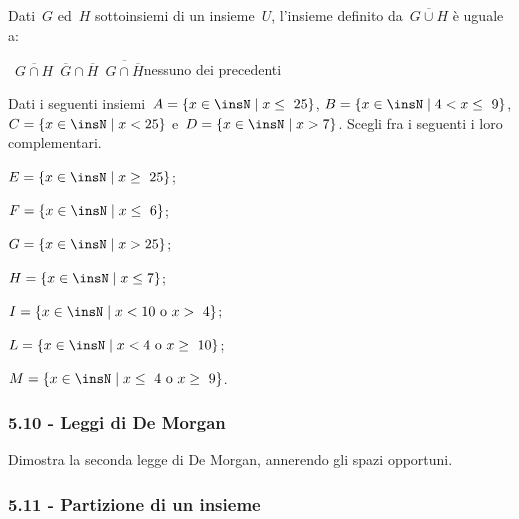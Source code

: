 \begin{esercizio}[\Ast]
 \label{ese:5.65}
Dati~$G$ ed~$H$ sottoinsiemi di un insieme~$U$, l'insieme
definito da~$\overline{G\cup H}$ è uguale a:
\begin{center}
\boxA\quad~$\overline{G\cap H}$\quad\boxB\quad~$\overline{G}\cap\overline{H}$\quad\boxC\quad~$\overline{G\cap \overline{H}}$\quad\boxD\quad nessuno dei precedenti
\end{center}
\end{esercizio}

\begin{esercizio}[\Ast]
\label{ese:5.66}
Dati i seguenti insiemi~$A=\{x\in\insN\mid x\le~25\}$, $B=\{x\in\insN\mid 4<x\le~9\}$, $C=\{x\in\insN\mid x<25\}$ e~$D=\{x\in\insN\mid x>7\}$.
Scegli fra i seguenti i loro complementari.
\begin{multicols}{2}
\begin{enumeratea}
\item $E=\{x\in\insN\mid x\ge~25\}$;
\item $F=\{x\in\insN\mid x\le~6\}$;
\item $G=\{x\in\insN\mid x>25\}$;
\item $H=\{x\in\insN\mid x\le 7\}$;
\item $I=\{x\in\insN\mid x<10\text{ o }x>~4\}$;
\item $L=\{x\in\insN\mid x<4\text{ o }x\ge~10\}$;
\item $M=\{x\in\insN\mid x\le~4\text{ o }x\ge~9\}$.
\end{enumeratea}
\end{multicols}
\end{esercizio}

\subsubsection*{5.10 - Leggi di De Morgan}

\begin{esercizio}
 \label{ese:5.67}
 Dimostra la seconda legge di De Morgan, annerendo gli spazi opportuni.
 \begin{center}
 
 \end{center}
\end{esercizio}

\subsubsection*{5.11 - Partizione di un insieme}

